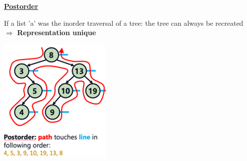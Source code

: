         {\centering\underline{\textbf{Postorder}} \par}
            \begin{minipage}{0.49\linewidth}
                
                If a list 'a' was the inorder traversal of a tree: the tree can always be recreated\\
                $\Rightarrow$ \textbf{Representation unique}
            \end{minipage}
            \begin{minipage}{0.49\linewidth}
                {\centering \includegraphics[width = 0.85\linewidth]{src/5_data_structure/images/postorder.png} \par}
            \end{minipage}


